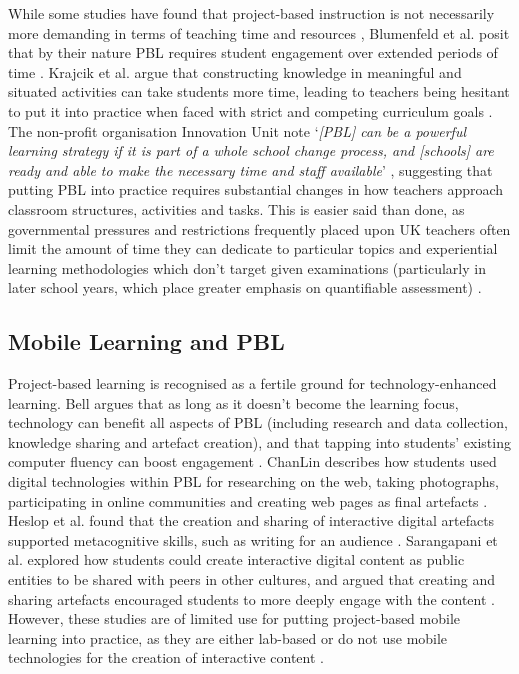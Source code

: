 While some studies have found that project-based instruction is not necessarily more demanding in terms of teaching time and resources \citep{Al-Balushi2014}, Blumenfeld et al. posit that by their nature PBL requires student engagement over extended periods of time \citep{Blumenfeld1991}. Krajcik et al. argue that constructing knowledge in meaningful and situated activities can take students more time, leading to teachers being hesitant to put it into practice when faced with strict and competing curriculum goals \citep{Krajcik2006}. The non-profit organisation Innovation Unit note `\textit{[PBL] can be a powerful learning strategy if it is part of a whole school change process, and [schools] are ready and able to make the necessary time and staff available}' \citep{InnovationUnit2016}, suggesting that putting PBL into practice requires substantial changes in how teachers approach classroom structures, activities and tasks. This is easier said than done, as governmental pressures and restrictions frequently placed upon UK teachers often limit the amount of time they can dedicate to particular topics and experiential learning methodologies which don't target given examinations (particularly in later school years, which place greater emphasis on quantifiable assessment) \citep{Ofsted2018}.

\subsection{Mobile Learning and PBL}
Project-based learning is recognised as a fertile ground for technology-enhanced learning. Bell argues that as long as it doesn't become the learning focus, technology can benefit all aspects of PBL (including research and data collection, knowledge sharing and artefact creation), and that tapping into students' existing computer fluency can boost engagement \citep{Bell2010}. ChanLin describes how students used digital technologies within PBL for researching on the web, taking photographs, participating in online communities and creating web pages as final artefacts \citep{ChanLin2008}. Heslop et al. found that the creation and sharing of interactive digital artefacts supported metacognitive skills, such as writing for an audience \citep{Heslop2017}. Sarangapani et al. explored how students could create interactive digital content as public entities to be shared with peers in other cultures, and argued that creating and sharing artefacts encouraged students to more deeply engage with the content \citep{Sarangapani2018}. However, these studies are of limited use for putting project-based mobile learning into practice, as they are either lab-based \citep{Heslop2017} or do not use mobile technologies for the creation of interactive content \citep{Sarangapani2018, ChanLin2008}.

